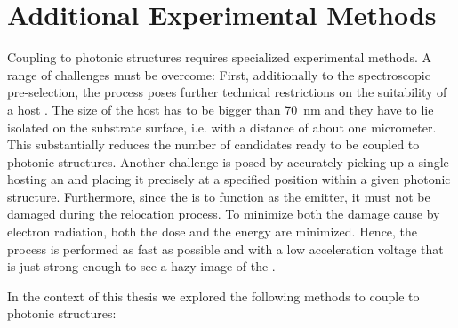 	\section{Additional Experimental Methods} \label{sec::methods_coupling}

	Coupling \sivs to photonic structures requires specialized experimental methods. 
	A range of challenges must be overcome:
	First, additionally to the spectroscopic pre-selection, the \pp process poses further technical restrictions on the suitability of a host \nd.
	The size of the host \nd has to be bigger than \SI{70}{nm} and they have to lie isolated on the substrate surface, i.e. with a distance of about one micrometer.
	This substantially reduces the number of \siv candidates ready to be coupled to photonic structures.
	Another challenge is posed by accurately picking up a single \nd hosting an \siv and placing it precisely at a specified position within a given photonic structure. 
	Furthermore, since the \siv is to function as the \pl emitter, it must not be damaged during the relocation process.
	To minimize both the damage cause by electron radiation, both the dose and the energy are minimized.
	Hence, the \pp process is performed as fast as possible and with a low acceleration voltage that is just strong enough to see a hazy image of the \nd.


	In the context of this thesis we explored the following methods to couple \nds to photonic structures:

